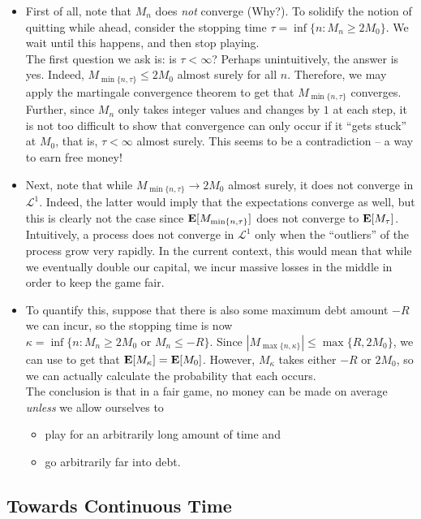 \begin{itemize}
	\item First of all, note that $M_n$ does \textit{not} converge (Why?). To solidify the notion of quitting while ahead, consider the stopping time $\tau = \inf\{n : M_n\geq 2M_0\}$. We wait until this happens, and then stop playing.\\
	The first question we ask is: is $\tau<\infty$? Perhaps unintuitively, the answer is yes. Indeed, $M_{\min\{n,\tau\}} \leq 2M_0$ almost surely for all $n$. Therefore, we may apply the martingale convergence theorem to get that $M_{\min\{n,\tau\}}$ converges. Further, since $M_n$ only takes integer values and changes by $1$ at each step, it is not too difficult to show that convergence can only occur if it ``gets stuck'' at $M_0$, that is, $\tau<\infty$ almost surely. This seems to be a contradiction --  a way to earn free money!

	\item Next, note that while $M_{\min\{n,\tau\}}\to 2M_0$ almost surely, it does not converge in $\mathcal{L}^1$. Indeed, the latter would imply that the expectations converge as well, but this is clearly not the case since $\textbf{E}[M_{\min\{n,\tau\}}]$ does not converge to $\textbf{E}[M_\tau]$. Intuitively, a process does not converge in $\mathcal{L}^1$ only when the ``outliers'' of the process grow very rapidly. In the current context, this would mean that while we eventually double our capital, we incur massive losses in the middle in order to keep the game fair.

	\item To quantify this, suppose that there is also some maximum debt amount $-R$ we can incur, so the stopping time is now $\kappa = \inf\{n : M_n\geq 2M_0 \text{ or }M_n\leq -R\}$. Since $|M_{\max\{n,\kappa\}}| \leq \max\{R,2M_0\}$, we can use  to get that $\textbf{E}[M_\kappa] = \textbf{E}[M_0]$. However, $M_\kappa$ takes either $-R$ or $2M_0$, so we can actually calculate the probability that each occurs.\\
	The conclusion is that in a fair game, no money can be made on average \textit{unless} we allow ourselves to
	\begin{itemize}
		\item play for an arbitrarily long amount of time and
		\item go arbitrarily far into debt.
	\end{itemize}
\end{itemize}

\subsection{Towards Continuous Time}

